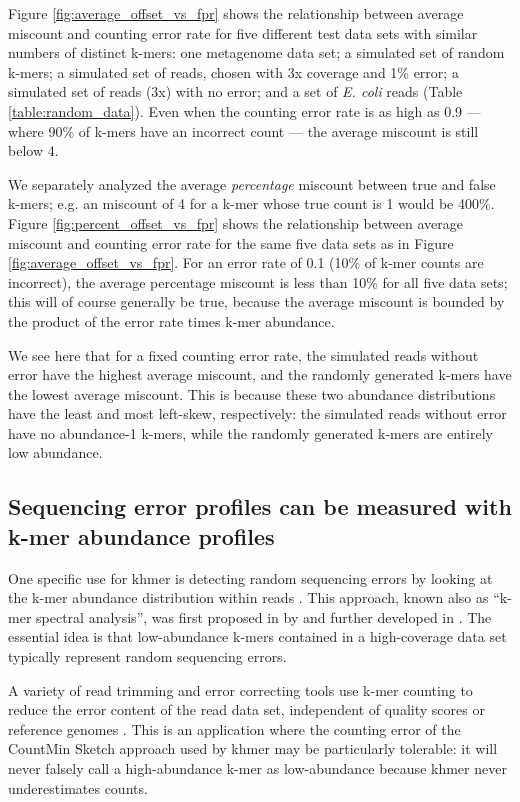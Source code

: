 \documentclass[10pt]{article}
\begin{document}
Figure \ref{fig:average_offset_vs_fpr} shows the relationship between
average miscount and counting error rate for five different test data
sets with similar numbers of distinct k-mers: one metagenome data set;
a simulated set of random k-mers; a simulated set of reads, chosen
with 3x coverage and 1\% error; a simulated set of reads (3x) with no
error; and a set of {\em E. coli} reads (Table
\ref{table:random_data}).  Even when the counting error rate is as
high as 0.9 --- where 90\% of k-mers have an incorrect count --- the
average miscount is still below 4.

We separately analyzed the average {\em percentage} miscount between
true and false k-mers; e.g. an miscount of 4 for a k-mer whose true
count is 1 would be 400\%.  Figure \ref{fig:percent_offset_vs_fpr}
shows the relationship between average miscount and counting error
rate for the same five data sets as in Figure
\ref{fig:average_offset_vs_fpr}.  For an error rate of 0.1 (10\% of
k-mer counts are incorrect), the average percentage miscount is less
than 10\% for all five data sets; this will of course generally be
true, because the average miscount is bounded by the product of the
error rate times k-mer abundance.

We see here that for a fixed counting error rate, the simulated reads
without error have the highest average miscount, and the randomly
generated k-mers have the lowest average miscount.  This is because
these two abundance distributions have the least and most left-skew,
respectively: the simulated reads without error have no abundance-1
k-mers, while the randomly generated k-mers are entirely low
abundance.

\subsection*{Sequencing error profiles can be measured with k-mer abundance
profiles}

One specific use for khmer is detecting random sequencing errors by
looking at the k-mer abundance distribution within reads
\cite{Medvedev2011}.  This approach, known also as ``k-mer spectral
analysis'', was first proposed in by \cite{Pevzner2001} and further
developed in \cite{Li2003}.  The essential idea is that low-abundance
k-mers contained in a high-coverage data set typically represent
random sequencing errors.

A variety of read trimming and error correcting tools use k-mer
counting to reduce the error content of the read data set, independent
of quality scores or reference genomes \cite{Kelley2010}.  This is an
application where the counting error of the CountMin Sketch approach
used by khmer may be particularly tolerable: it will never falsely
call a high-abundance k-mer as low-abundance because khmer never
underestimates counts.
\end{document}
